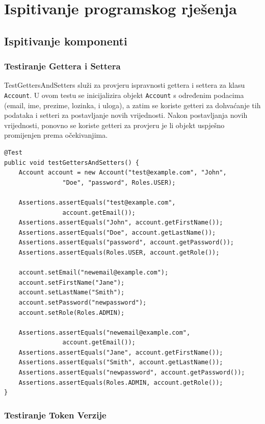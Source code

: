 			
			\eject 
		
	
		\section{Ispitivanje programskog rješenja}

			\subsection{Ispitivanje komponenti}
			
			\subsubsection{Testiranje Gettera i Settera}
			
			TestGettersAndSetters služi za provjeru ispravnosti gettera i settera za klasu \texttt{Account}. U ovom testu se inicijalizira objekt \texttt{Account} s određenim podacima (email, ime, prezime, lozinka, i uloga), a zatim se koriste getteri za dohvaćanje tih podataka i setteri za postavljanje novih vrijednosti. Nakon postavljanja novih vrijednosti, ponovno se koriste getteri za provjeru je li objekt uspješno promijenjen prema očekivanjima.
			
			\begin{lstlisting}
@Test
public void testGettersAndSetters() {
	Account account = new Account("test@example.com", "John", 
				"Doe", "password", Roles.USER);
	
	Assertions.assertEquals("test@example.com", 
				account.getEmail());
	Assertions.assertEquals("John", account.getFirstName());
	Assertions.assertEquals("Doe", account.getLastName());
	Assertions.assertEquals("password", account.getPassword());
	Assertions.assertEquals(Roles.USER, account.getRole());
	
	account.setEmail("newemail@example.com");
	account.setFirstName("Jane");
	account.setLastName("Smith");
	account.setPassword("newpassword");
	account.setRole(Roles.ADMIN);
	
	Assertions.assertEquals("newemail@example.com", 
				account.getEmail());
	Assertions.assertEquals("Jane", account.getFirstName());
	Assertions.assertEquals("Smith", account.getLastName());
	Assertions.assertEquals("newpassword", account.getPassword());
	Assertions.assertEquals(Roles.ADMIN, account.getRole());
}
			\end{lstlisting}
			
			\subsubsection{Testiranje Token Verzije}
			
